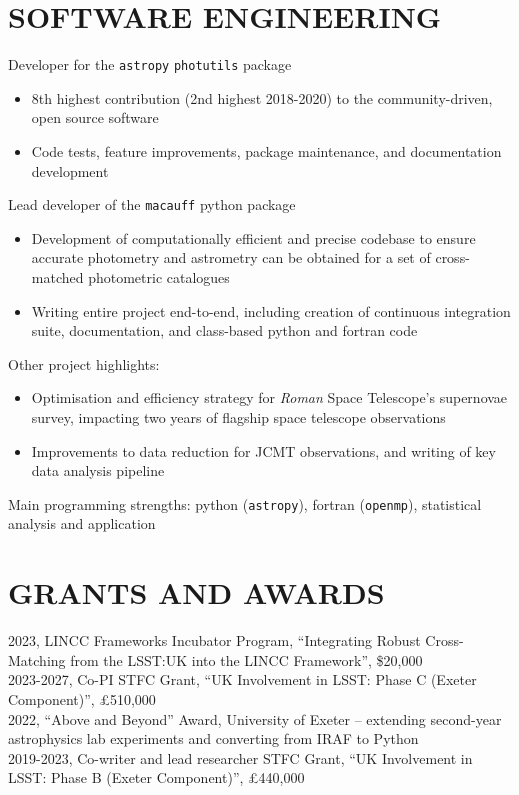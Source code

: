 \documentclass[letter, margin, 10pt]{res} %
\begin{document}
\begin{resume}
\section{SOFTWARE ENGINEERING}

Developer for the \texttt{astropy} \texttt{photutils} package
\begin{itemize}[noitemsep,topsep=0pt,parsep=0pt,partopsep=0pt]
\item 8th highest contribution (2nd highest 2018-2020) to the community-driven, open source software
\item Code tests, feature improvements, package maintenance, and documentation development
\end{itemize}
\vspace{-10pt}
Lead developer of the \texttt{macauff} python package
\begin{itemize}[noitemsep,topsep=0pt,parsep=0pt,partopsep=0pt]
\item Development of computationally efficient and precise codebase to ensure accurate photometry and astrometry can be obtained for a set of cross-matched photometric catalogues
\item Writing entire project end-to-end, including creation of continuous integration suite, documentation, and class-based python and fortran code
\end{itemize}
\vspace{-10pt}
Other project highlights:
\begin{itemize}[noitemsep,topsep=0pt,parsep=0pt,partopsep=0pt]
\item Optimisation and efficiency strategy for \textit{Roman} Space Telescope's supernovae survey, impacting two years of flagship space telescope observations
\item Improvements to data reduction for JCMT observations, and writing of key data analysis pipeline
\end{itemize}
\vspace{-10pt}
Main programming strengths: python (\texttt{astropy}), fortran (\texttt{openmp}), statistical analysis and application

\parskip 5pt
\vspace{-6pt}
\section{GRANTS AND AWARDS}
2023, LINCC Frameworks Incubator Program, ``Integrating Robust Cross-Matching from the LSST:UK into the LINCC Framework'', \$20,000\\
2023-2027, Co-PI STFC Grant, ``UK Involvement in LSST: Phase C (Exeter Component)'', £510,000\\
2022, ``Above and Beyond'' Award, University of Exeter -- extending second-year astrophysics lab experiments and converting from IRAF to Python\\
2019-2023, Co-writer and lead researcher STFC Grant, ``UK Involvement in LSST: Phase B (Exeter Component)'', £440,000


\end{resume}
\end{document}
